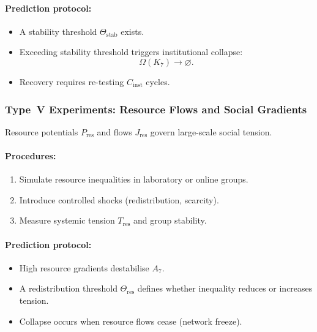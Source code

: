 \paragraph{Prediction protocol:}

\begin{itemize}
    \item A stability threshold $\Theta_{\mathrm{stab}}$ exists.
    \item Exceeding stability threshold triggers institutional collapse:
          \[
             \Omega(K_7) \rightarrow \varnothing.
          \]
    \item Recovery requires re-testing $C_{\mathrm{inst}}$ cycles.
\end{itemize}



\subsubsection{Type~V Experiments: Resource Flows and Social Gradients}

Resource potentials $P_{\mathrm{res}}$ and flows $J_{\mathrm{res}}$
govern large-scale social tension.

\paragraph{Procedures:}

\begin{enumerate}
    \item Simulate resource inequalities in laboratory or online groups.
    \item Introduce controlled shocks (redistribution, scarcity).
    \item Measure systemic tension $T_{\mathrm{res}}$ and group stability.
\end{enumerate}

\paragraph{Prediction protocol:}

\begin{itemize}
    \item High resource gradients destabilise $A_7$.
    \item A redistribution threshold $\Theta_{\mathrm{res}}$ defines
          whether inequality reduces or increases tension.
    \item Collapse occurs when resource flows cease (network freeze).
\end{itemize}



